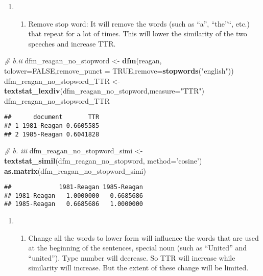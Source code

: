 \documentclass[]{article}
\newenvironment{Shaded}{\begin{snugshade}}{\end{snugshade}}
\newcommand{\KeywordTok}[1]{\textcolor[rgb]{0.13,0.29,0.53}{\textbf{#1}}}
\newcommand{\DataTypeTok}[1]{\textcolor[rgb]{0.13,0.29,0.53}{#1}}
\newcommand{\StringTok}[1]{\textcolor[rgb]{0.31,0.60,0.02}{#1}}
\newcommand{\CommentTok}[1]{\textcolor[rgb]{0.56,0.35,0.01}{\textit{#1}}}
\newcommand{\OtherTok}[1]{\textcolor[rgb]{0.56,0.35,0.01}{#1}}
\newcommand{\NormalTok}[1]{#1}
\providecommand{\tightlist}{%
  \setlength{\itemsep}{0pt}\setlength{\parskip}{0pt}}
\begin{document}
\begin{enumerate}
\def\labelenumi{(\alph{enumi})}
\setcounter{enumi}{1}
\item
  \begin{enumerate}
  \def\labelenumii{\roman{enumii}.}
  \tightlist
  \item
    Remove stop word: It will remove the words (such as ``a'',
    ``the''``, etc.) that repeat for a lot of times. This will lower the
    similarity of the two speeches and increase TTR.
  \end{enumerate}
\end{enumerate}

\begin{Shaded}
\begin{Highlighting}[]
\CommentTok{# b.ii}
\NormalTok{dfm_reagan_no_stopword <-}\StringTok{ }\KeywordTok{dfm}\NormalTok{(reagan, }\DataTypeTok{tolower=}\OtherTok{FALSE}\NormalTok{,}\DataTypeTok{remove_punct =} \OtherTok{TRUE}\NormalTok{,}\DataTypeTok{remove=}\KeywordTok{stopwords}\NormalTok{(}\StringTok{"english"}\NormalTok{))}
\NormalTok{dfm_reagan_no_stopword_TTR <-}\StringTok{ }\KeywordTok{textstat_lexdiv}\NormalTok{(dfm_reagan_no_stopword,}\DataTypeTok{measure=}\StringTok{"TTR"}\NormalTok{)}
\NormalTok{dfm_reagan_no_stopword_TTR}
\end{Highlighting}
\end{Shaded}

\begin{verbatim}
##      document       TTR
## 1 1981-Reagan 0.6605585
## 2 1985-Reagan 0.6041828
\end{verbatim}

\begin{Shaded}
\begin{Highlighting}[]
\CommentTok{# b. iii}
\NormalTok{dfm_reagan_no_stopword_simi <-}\StringTok{ }\KeywordTok{textstat_simil}\NormalTok{(dfm_reagan_no_stopword, }\DataTypeTok{method=}\StringTok{'cosine'}\NormalTok{)}
\KeywordTok{as.matrix}\NormalTok{(dfm_reagan_no_stopword_simi)}
\end{Highlighting}
\end{Shaded}

\begin{verbatim}
##             1981-Reagan 1985-Reagan
## 1981-Reagan   1.0000000   0.6685686
## 1985-Reagan   0.6685686   1.0000000
\end{verbatim}

\begin{enumerate}
\def\labelenumi{(\alph{enumi})}
\setcounter{enumi}{2}
\item
  \begin{enumerate}
  \def\labelenumii{\roman{enumii}.}
  \tightlist
  \item
    Change all the words to lower form will influence the words that are
    used at the beginning of the sentences, special noun (such as
    ``United'' and ``united''). Type number will decrease. So TTR will
    increase while similarity will increase. But the extent of these
    change will be limited.
  \end{enumerate}
\end{enumerate}
\end{document}
